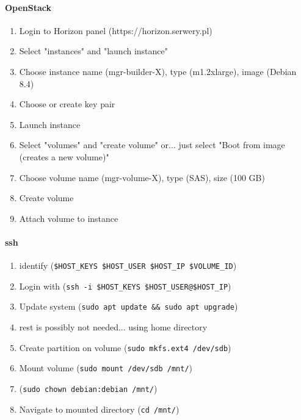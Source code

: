 \documentclass[printmode]{mgr}
\begin{document}



\paragraph{OpenStack}

\begin{enumerate}
  \item Login to Horizon panel (https://horizon.serwery.pl)
  \item Select "instances" and "launch instance"
  \item Choose instance name (mgr-builder-X), type (m1.2xlarge), image (Debian 8.4)
  \item Choose or create key pair
  \item Launch instance
  \item Select "volumes" and "create volume" or... just select "Boot from image (creates a new volume)" 
  \item Choose volume name (mgr-volume-X), type (SAS), size (100 GB)
  \item Create volume
  \item Attach volume to instance
\end{enumerate}

\paragraph{ssh}

\begin{enumerate}
  \item identify (\verb|$HOST_KEYS $HOST_USER $HOST_IP $VOLUME_ID|)
  \item Login with (\verb|ssh -i $HOST_KEYS $HOST_USER@$HOST_IP|)
  \item Update system (\verb|sudo apt update && sudo apt upgrade|)
  \item rest is possibly not needed... using home directory
  \item Create partition on volume (\verb|sudo mkfs.ext4 /dev/sdb|)
  \item Mount volume (\verb|sudo mount /dev/sdb /mnt/|)
  \item (\verb|sudo chown debian:debian /mnt/|)
  \item Navigate to mounted directory (\verb|cd /mnt/|)
\end{enumerate}
\end{document}
